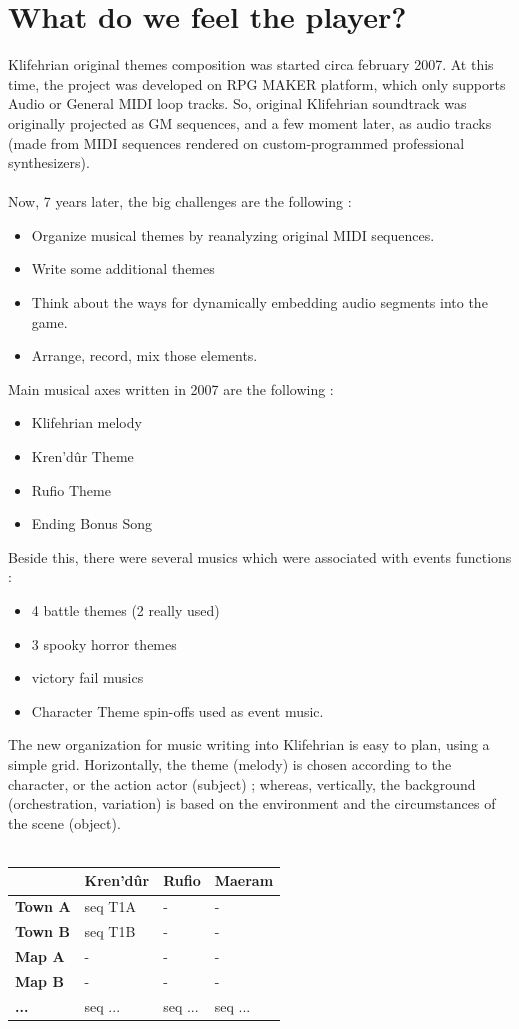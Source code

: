 \documentclass[a4paper,12pt]{book}
\begin{document}
\chapter{What do we feel the player?}
Klifehrian original themes composition was started circa february 2007. At this time, the project was developed on RPG MAKER platform, which only supports Audio or General MIDI loop tracks. So, original Klifehrian soundtrack was originally projected as GM sequences, and a few moment later, as audio tracks (made from MIDI sequences rendered on custom-programmed professional synthesizers).
\\ \\
Now, 7 years later, the big challenges are the following :
\begin{itemize}
	\item Organize musical themes by reanalyzing original MIDI sequences.
	\item Write some additional themes
	\item Think about the ways for dynamically embedding audio segments into the game.
	\item Arrange, record, mix those elements.
\end{itemize}
Main musical axes written in 2007 are the following :
\begin{itemize}
	\item Klifehrian melody
	\item Kren'd\^ur Theme
	\item Rufio Theme
	\item Ending Bonus Song
\end{itemize}
\newpage Beside this, there were several musics which were associated with events \/ functions :
\begin{itemize}
	\item 4 battle themes (2 really used)
	\item 3 spooky \/ horror themes
	\item victory \/ fail musics
	\item Character Theme spin-offs used as event music.
\end{itemize}
The new organization for music writing into Klifehrian is easy to plan, using a simple grid.
Horizontally, the theme (melody) is chosen according to the character, or the action actor (subject) ; whereas, vertically, the background (orchestration, variation) is based on the environment and the circumstances of the scene (object).
\\ \\
\begin{tabular}{|>{\centering \arraybackslash}p{3cm}|>{\centering \arraybackslash}p{3cm}|>{\centering \arraybackslash}p{3cm}|>{\centering \arraybackslash}p{3cm}|}
\hline
 & \textbf{Kren'd\^ur} & \textbf{Rufio} & \textbf{Maeram} \\ 
\hline
\textbf{Town A} & seq T1A & - & - \\
\hline
\textbf{Town B} & seq T1B & - & - \\
\hline
\textbf{Map A} & - & - & - \\
\hline
\textbf{Map B} & - & - & - \\
\hline
 \textbf{...} & seq ... & seq ... & seq ... \\
\hline
\end{tabular}
\end{document}
